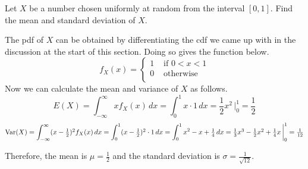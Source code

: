 \begin{example}\label{MeanVarianceUnitInterval}
Let $X$ be a number chosen uniformly at random from the interval $[0,1]$. Find the mean and standard deviation of $X$.

The pdf of $X$ can be obtained by differentiating the cdf we came up with in the discussion at the start of this section. Doing so gives the function below.
$$f_X(x) = \left\{
\begin{array}{cl}
      1 & \text{ if \ } 0 < x < 1  \\
      0 & \text{ otherwise \ }  \\ \end{array}
\right.$$
Now we can calculate the mean and variance of $X$ as follows.
$$E(X) = \int_{-\infty}^{\infty} x f_X(x) \, dx = \int_{0}^{1} x \cdot 1 \, dx = \textstyle\frac{1}{2}x^2 \,\biggr|_{0}^{1}=\frac{1}{2}$$
$$\operatorname{Var}(X) = \int_{-\infty}^{\infty} (x-\textstyle\frac{1}{2})^2 f_X(x) \, dx = \displaystyle\int_{0}^{1} (x-\textstyle\frac{1}{2})^2  \cdot 1 \, dx = \displaystyle\int_{0}^{1} x^2-x+\textstyle\frac{1}{4} \, dx = \textstyle\frac{1}{3}x^3 - \frac{1}{2}x^2 + \frac{1}{4}x \,\biggr|_{0}^{1}=\frac{1}{12}$$

Therefore, the mean is $\mu = \frac{1}{2}$ and the standard deviation is $\sigma = \frac{1}{\sqrt{12}}$.
\end{example}


